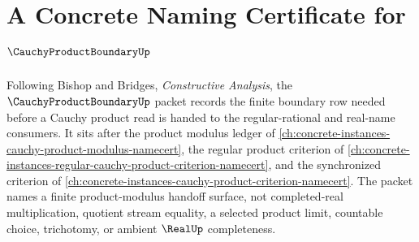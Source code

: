 \chapter{A Concrete Naming Certificate for $\CauchyProductBoundaryUp$}
\label{ch:concrete-instances-cauchy-product-boundary-namecert}

Following Bishop and Bridges, \emph{Constructive Analysis}, the $\CauchyProductBoundaryUp$ packet records the finite boundary row needed before a Cauchy product read is handed to the regular-rational and real-name consumers. It sits after the product modulus ledger of \autoref{ch:concrete-instances-cauchy-product-modulus-namecert}, the regular product criterion of \autoref{ch:concrete-instances-regular-cauchy-product-criterion-namecert}, and the synchronized criterion of \autoref{ch:concrete-instances-cauchy-product-criterion-namecert}. The packet names a finite product-modulus handoff surface, not completed-real multiplication, quotient stream equality, a selected product limit, countable choice, trichotomy, or ambient $\RealUp$ completeness.

